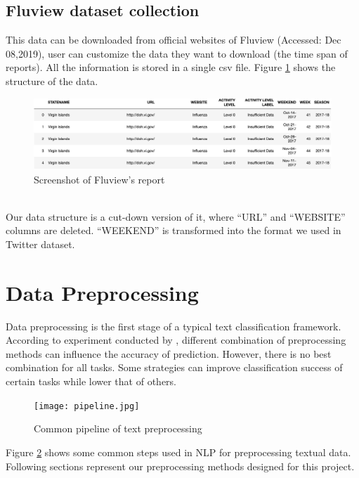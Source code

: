 \subsection{Fluview dataset collection}
This data can be downloaded from official websites of Fluview \cite{cdc:fluView} (Accessed: Dec 08,2019), user can customize the data they want to download (the time span of reports). All the information is stored in a single csv file. Figure \ref{fig:fluView1} shows the structure of the data. 
\begin{figure}[!htbp]
    \center
    \includegraphics[width=5.5in]{images/fluView1.png}
    \caption{Screenshot of Fluview's report}
    \label{fig:fluView1}
\end{figure}
\\
Our data structure is a cut-down version of it, where ``URL'' and ``WEBSITE'' columns are deleted. ``WEEKEND'' is transformed into the format we used in Twitter dataset.

\section{Data Preprocessing}
\label{sec:Preprocessing}
Data preprocessing is the first stage of a typical text classification framework. According to experiment conducted by \cite{uysal2014impact}, different combination of preprocessing methods can influence the accuracy of prediction. However, there is no best combination for all tasks. Some strategies can improve classification success of certain tasks while lower that of others.
\begin{figure}[!htbp]
    \centering
    \texttt{[image: pipeline.jpg]}
    \caption{Common pipeline of text preprocessing}
    \label{fig:pipeline}
\end{figure} 
Figure \ref{fig:pipeline} shows some common steps used in NLP for preprocessing textual data. Following sections represent our preprocessing methods designed for this project.
